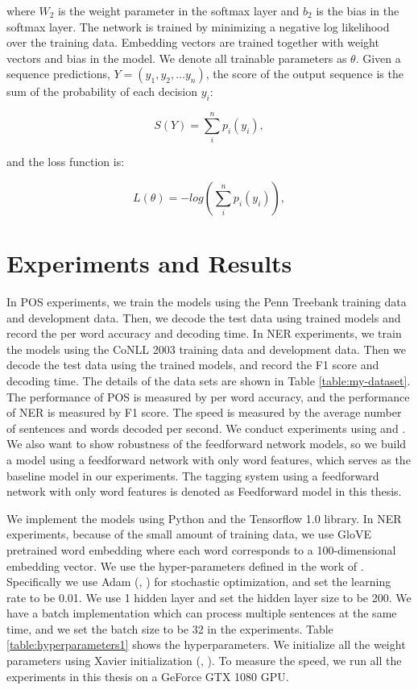 where $W_{2}$ is the weight parameter in the softmax layer and $b_{2}$ is the bias in the softmax layer. The network is trained by minimizing a negative log likelihood over the training data. Embedding vectors are trained together with weight vectors and bias in the model. We denote all trainable parameters as $\theta$. Given a sequence predictions, $Y=\left( y_{1},y_{2},\ldots y_{n}\right)$,
the score of the output sequence is the sum of the probability of each decision $y_{i}$: 

\begin{equation}
S\left( Y\right) = \sum _{i}^{n}p_{i}\left(y_{i}\right),
\end{equation}

and the loss function is:

\begin{equation}
L\left(\theta\right) = -log\left(\sum _{i}^{n}p_{i}\left(y_{i}\right)\right),
\end{equation}

\section{Experiments and Results}

In POS experiments, we train the models using the Penn Treebank training data and development data. Then, we decode the test data using trained models and record the per word accuracy and decoding time. In NER experiments, we train the models using the CoNLL 2003 training data and development data. Then we decode the test data using the trained models, and record the F1 score and decoding time. The details of the data sets are shown in Table \ref{table:my-dataset}. The performance of POS is measured by per word accuracy, and the performance of NER is measured by F1 score. The speed is measured by the average number of sentences and words decoded per second. We conduct experiments using \ffa{} and \ffb. We also want to show robustness of the feedforward network models, so we build a model using a feedforward network with only word features, which serves as the baseline model in our experiments. The tagging system using a feedforward network with only word features is denoted as Feedforward model in this thesis.

We implement the models using Python and the Tensorflow 1.0 library. In NER experiments, because of the small amount of training data, we use GloVE pretrained word embedding where each word corresponds to a 100-dimensional embedding vector. We use the hyper-parameters defined in the work of \cite{chen2014fast}. Specifically we use Adam (\citeauthor{kingma2014adam}, \citeyear{kingma2014adam}) for stochastic optimization, and set the learning rate to be 0.01. We use 1 hidden layer and set the hidden layer size to be 200. We have a batch implementation which can process multiple sentences at the same time, and we set the batch size to be 32 in the experiments. Table \ref{table:hyperparameters1} shows the hyperparameters. We initialize all the weight parameters using Xavier initialization (\citeauthor{glorot2011domain}, \citeyear{glorot2011domain}). To measure the speed, we run all the experiments in this thesis on a GeForce GTX 1080 GPU.

